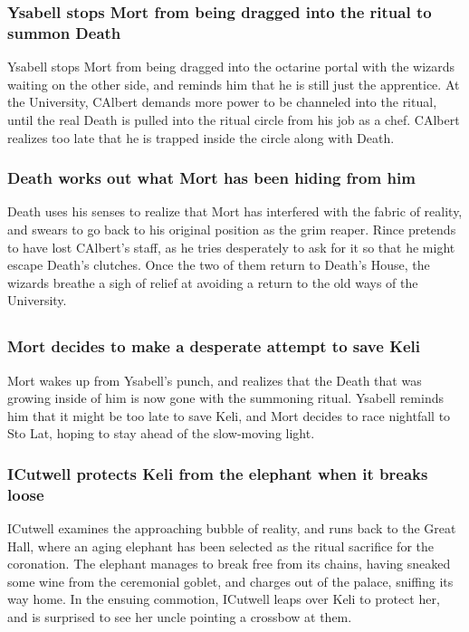 \subsubsection{\Gls{Ysabell} stops \Gls{Mort} from being dragged into the ritual to summon
    \Gls{Death}}
\Gls{Ysabell} stops \Gls{Mort} from being dragged into the octarine portal with the wizards
waiting on the other side, and reminds him that he is still just the apprentice. At the University,
\Gls{CAlbert} demands more power to be channeled into the ritual, until the real \Gls{Death} is
pulled into the ritual circle from his job as a chef. \Gls{CAlbert} realizes too late that he is
trapped inside the circle along with \Gls{Death}.

\subsubsection{\Gls{Death} works out what \Gls{Mort} has been hiding from him}
\Gls{Death} uses his senses to realize that \Gls{Mort} has interfered with the fabric of reality,
and swears to go back to his original position as the grim reaper. \Gls{Rince} pretends to have
lost \Gls{CAlbert}'s staff, as he tries desperately to ask for it so that he might escape
\Gls{Death}'s clutches. Once the two of them return to \Gls{Death}'s House, the wizards breathe a
sigh of relief at avoiding a return to the old ways of the University.

\subsection{}
\subsubsection{\Gls{Mort} decides to make a desperate attempt to save \Gls{Keli}}
\Gls{Mort} wakes up from \Gls{Ysabell}'s punch, and realizes that the Death that was growing inside
of him is now gone with the summoning ritual. \Gls{Ysabell} reminds him that it might be too late
to save \Gls{Keli}, and \Gls{Mort} decides to race nightfall to Sto Lat, hoping to stay ahead of
the slow-moving light.

\subsubsection{\Gls{ICutwell} protects \Gls{Keli} from the elephant when it breaks loose}
\Gls{ICutwell} examines the approaching bubble of reality, and runs back to the Great Hall, where
an aging elephant has been selected as the ritual sacrifice for the coronation. The elephant
manages to break free from its chains, having sneaked some wine from the ceremonial goblet, and
charges out of the palace, sniffing its way home. In the ensuing commotion, \Gls{ICutwell} leaps
over \Gls{Keli} to protect her, and is surprised to see her uncle pointing a crossbow at them.

